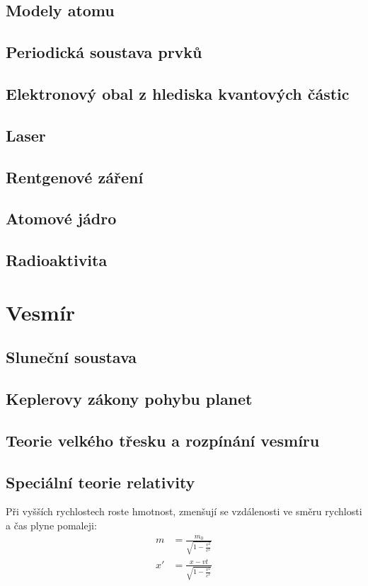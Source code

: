 \documentclass[titlepage]{book}
\begin{document}
\section{Modely atomu}

\section{Periodická soustava prvků}

\section{Elektronový obal z hlediska kvantových částic}

\section{Laser}

\section{Rentgenové záření}

\section{Atomové jádro}

\section{Radioaktivita}

\chapter{Vesmír}

\section{Sluneční soustava}

\section{Keplerovy zákony pohybu planet}

\section{Teorie velkého třesku a rozpínání vesmíru}

\section{Speciální teorie relativity}
Při vyšších rychlostech roste hmotnost, zmenšují se vzdálenosti ve směru rychlosti a čas plyne pomaleji:\\
\begin{align}
m &= \frac{m_0}{\sqrt{1 - \frac{v^2}{c^2}}}\\
x' &= \frac{x - vt}{\sqrt{1 - \frac{v^2}{c^2}}}\\
\end{align}
\end{document}
